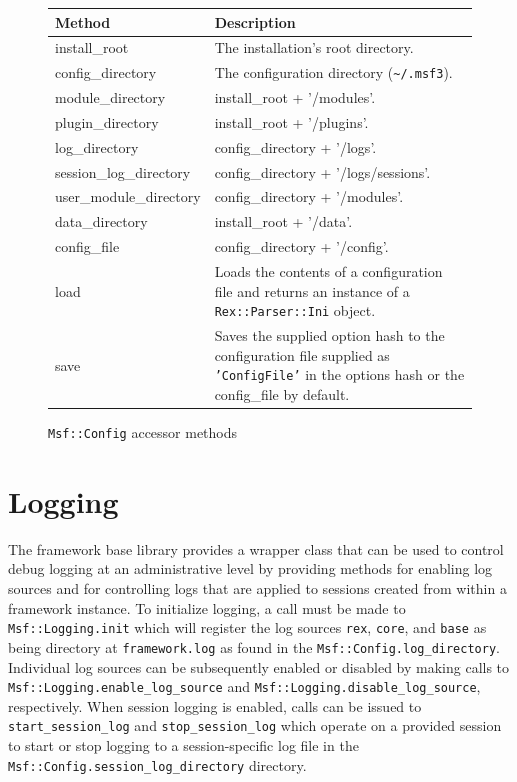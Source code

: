 \documentclass{report}
\begin{document}
\begin{figure}[h]
\begin{center}
\begin{tabular}{|l|p{3.5in}|}
\hline
\textbf{Method} & \textbf{Description} \\
\hline
install\_root & The installation's root directory. \\
\hline
config\_directory & The configuration directory (\verb#~/.msf3#). \\
\hline
module\_directory & install\_root + '/modules'. \\
\hline
plugin\_directory & install\_root + '/plugins'. \\
\hline
log\_directory & config\_directory + '/logs'. \\
\hline
session\_log\_directory & config\_directory + '/logs/sessions'. \\
\hline
user\_module\_directory & config\_directory + '/modules'. \\
\hline
data\_directory & install\_root + '/data'. \\
\hline
config\_file & config\_directory + '/config'. \\
\hline
load & Loads the contents of a configuration file and returns an instance of a \texttt{Rex::Parser::Ini} object. \\
\hline
save & Saves the supplied option hash to the configuration file supplied as \texttt{'ConfigFile'} in the options hash or the config\_file by default. \\
\hline
\end{tabular}
\caption{\texttt{Msf::Config} accessor methods}
\label{fig-table-config}
\end{center}
\end{figure}

    \section{Logging}

\par
The framework base library provides a wrapper class that can be used
to control debug logging at an administrative level by providing
methods for enabling log sources and for controlling logs that are
applied to sessions created from within a framework instance.  To
initialize logging, a call must be made to
\texttt{Msf::Logging.init} which will register the log sources
\texttt{rex}, \texttt{core}, and \texttt{base} as being directory at
\texttt{framework.log} as found in the
\texttt{Msf::Config.log\_directory}.  Individual log sources can be
subsequently enabled or disabled by making calls to
\texttt{Msf::Logging.enable\_log\_source} and
\texttt{Msf::Logging.disable\_log\_source}, respectively.  When
session logging is enabled, calls can be issued to
\texttt{start\_session\_log} and \texttt{stop\_session\_log} which
operate on a provided session to start or stop logging to a
session-specific log file in the
\texttt{Msf::Config.session\_log\_directory} directory.
\end{document}
